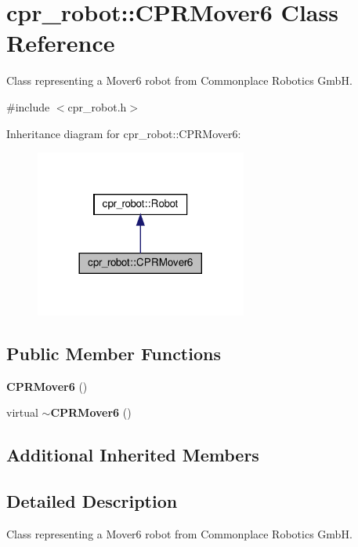 \section{cpr\+\_\+robot\+:\+:C\+P\+R\+Mover6 Class Reference}
\label{classcpr__robot_1_1CPRMover6}


Class representing a Mover6 robot from Commonplace Robotics GmbH.  




{\ttfamily \#include $<$cpr\+\_\+robot.\+h$>$}



Inheritance diagram for cpr\+\_\+robot\+:\+:C\+P\+R\+Mover6\+:
\nopagebreak
\begin{figure}[H]
\begin{center}
\leavevmode
\includegraphics[width=197pt]{classcpr__robot_1_1CPRMover6__inherit__graph}
\end{center}
\end{figure}
\subsection*{Public Member Functions}
\begin{DoxyCompactItemize}
\item 
\textbf{ C\+P\+R\+Mover6} ()
\item 
virtual \textbf{ $\sim$\+C\+P\+R\+Mover6} ()
\end{DoxyCompactItemize}
\subsection*{Additional Inherited Members}


\subsection{Detailed Description}
Class representing a Mover6 robot from Commonplace Robotics GmbH. 

